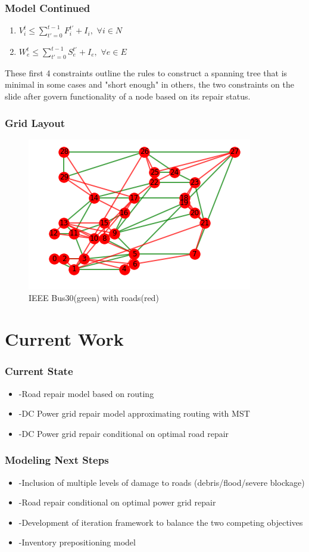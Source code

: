 \documentclass[t, pdftex]{beamer}
\begin{document}
\begin{frame}
\frametitle{Model Continued}
	\begin{enumerate}[label=(\arabic*), leftmargin=*, itemsep=0.4ex, before={\everymath{\displaystyle}}]
\item $V_i^t \leq \sum_{t'=0}^{t-1} F_i^{t'}+I_i, \hspace{4pt} \forall i \in N$ 
\item $W_{e}^t \leq \sum_{t'=0}^{t-1} S_{e}^{t'}+I_e, \hspace{4pt} \forall e \in E $
\end{enumerate}
These first 4 constraints outline the rules to construct a spanning tree that is minimal in some cases and "short enough" in others, the two constraints on the slide after govern functionality of a node based on its repair status.
\end{frame}

\begin{frame}
\frametitle{Grid Layout}
\begin{figure}
\caption{IEEE Bus30(green) with roads(red) }
\includegraphics[scale=.5]{GridLayout.png}
\end{figure}
\end{frame}
\section{Current Work}
\begin{frame}
\frametitle{Current State}
\begin{itemize}
	\item -Road repair model based on routing
	\item -DC Power grid repair model approximating routing with MST
	\item -DC Power grid repair conditional on optimal road repair
\end{itemize}
\end{frame}
\begin{frame}
\frametitle{Modeling Next Steps}
\begin{itemize}
	\item -Inclusion of multiple levels of damage to roads (debris/flood/severe blockage)
	\item -Road repair conditional on optimal power grid repair
	\item -Development of iteration framework to balance the two competing objectives
	\item -Inventory prepositioning model
\end{itemize}
\end{frame}
\end{document}
